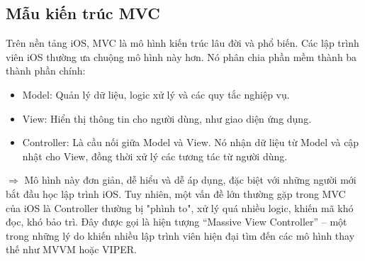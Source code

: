 \subsection{Mẫu kiến trúc MVC}
\renewcommand{\labelitemi}{--}    
    \begin{flushleft}
        \hspace*{0.8cm}Trên nền tảng iOS, MVC là mô hình kiến trúc lâu đời và phổ biến. Các lập trình viên iOS thường ưa chuộng mô hình này hơn. Nó phân chia phần mềm thành ba thành phần chính:
        \setlength{\leftmargini}{1.5cm}
        \begin{itemize}
            \item Model: Quản lý dữ liệu, logic xử lý và các quy tắc nghiệp vụ.
            \item View: Hiển thị thông tin cho người dùng, như giao diện ứng dụng.
            \item Controller: Là cầu nối giữa Model và View. Nó nhận dữ liệu từ Model và cập nhật cho View, đồng thời xử lý các tương tác từ người dùng.
        \end{itemize}
    \end{flushleft}

    \begin{flushleft}
      \hspace*{0.8cm}$\Rightarrow$ Mô hình này đơn giản, dễ hiểu và dễ áp dụng, đặc biệt với những người mới bắt đầu học lập trình iOS. Tuy nhiên, một vấn đề lớn thường gặp trong MVC của iOS là Controller thường bị "phình to", xử lý quá nhiều logic, khiến mã khó đọc, khó bảo trì. Đây được gọi là hiện tượng “Massive View Controller” – một trong những lý do khiến nhiều lập trình viên hiện đại tìm đến các mô hình thay thế như MVVM hoặc VIPER.
    \end{flushleft}

